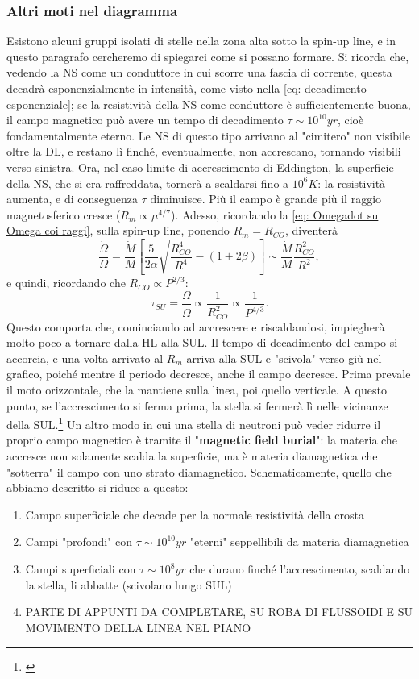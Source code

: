 \subsubsection{Altri moti nel diagramma}
Esistono alcuni gruppi isolati di stelle nella zona alta sotto la spin-up line, e in questo paragrafo cercheremo di spiegarci come si possano formare.
Si ricorda che, vedendo la NS come un conduttore in cui scorre una fascia di corrente, questa decadrà esponenzialmente in intensità, come visto nella \eqref{eq: decadimento esponenziale}; se la resistività della NS come conduttore è sufficientemente buona, il campo magnetico può avere un tempo di decadimento $\tau\sim10^{10}yr$, cioè fondamentalmente eterno.
Le NS di questo tipo arrivano al "cimitero" non visibile oltre la DL, e restano lì finché, eventualmente, non accrescano, tornando visibili verso sinistra.
Ora, nel caso limite di accrescimento di Eddington, la superficie della NS, che si era raffreddata, tornerà a scaldarsi fino a $10^6K$: la resistività aumenta, e di conseguenza $\tau$ diminuisce.
Più il campo è grande più il raggio magnetosferico cresce ($R_m\propto\mu^{4/7}$).
Adesso, ricordando la \eqref{eq: Omegadot su Omega coi raggi}, sulla spin-up line, ponendo $R_m=R_{CO}$, diventerà
\begin{equation}
    \frac{\dot{\Omega}}{\Omega} = \frac{\dot{M}}{M} \left[ \frac{5}{2\alpha} \sqrt{\frac{R_{CO}^4}{R^4}} - (1+2\beta) \right] \sim \frac{\dot{M}}{M}\frac{R_{CO}^2}{R^2},
\end{equation}
e quindi, ricordando che $R_{CO}\propto P^{2/3}$:
\begin{equation}
    \tau_{SU} = \frac{\Omega}{\dot{\Omega}}\propto\frac{1}{R_{CO}^2} \propto \frac{1}{P^{4/3}}.
\end{equation}
Questo comporta che, cominciando ad accrescere e riscaldandosi, impiegherà molto poco a tornare dalla HL alla SUL.
Il tempo di decadimento del campo si accorcia, e una volta arrivato al $R_m$ arriva alla SUL e "scivola" verso giù nel grafico, poiché mentre il periodo decresce, anche il campo decresce.
Prima prevale il moto orizzontale, che la mantiene sulla linea, poi quello verticale.
A questo punto, se l'accrescimento si ferma prima, la stella si fermerà lì nelle vicinanze della SUL.\footnote{\cite{Burderi_1996}}
Un altro modo in cui una stella di neutroni può veder ridurre il proprio campo magnetico è tramite il "\textbf{magnetic field burial}": la materia che accresce non solamente scalda la superficie, ma è materia diamagnetica che "sotterra" il campo con uno strato diamagnetico.
Schematicamente, quello che abbiamo descritto si riduce a questo:
\begin{enumerate}
    \item Campo superficiale che decade per la normale resistività della crosta
    \item Campi "profondi" con $\tau \sim 10^{10}yr$ "eterni" seppellibili da materia diamagnetica
    \item Campi superficiali con $\tau\sim10^8yr$ che durano finché l'accrescimento, scaldando la stella, li abbatte (scivolano lungo SUL)
    \item PARTE DI APPUNTI DA COMPLETARE, SU ROBA DI FLUSSOIDI E SU MOVIMENTO DELLA LINEA NEL PIANO
\end{enumerate}

